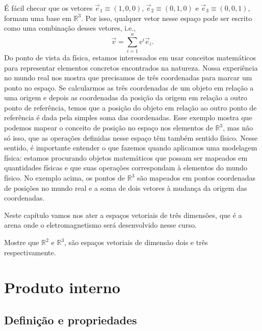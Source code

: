 É fácil checar que os vetores $\vec{e}_1 \equiv (1,0,0)$, $\vec{e}_2 \equiv
	(0,1,0)$ e $\vec{e}_3 \equiv (0,0,1)$, formam uma base em $\mathbb{R}^3$. Por
isso, qualquer vetor nesse espaço pode ser escrito como uma combinação desses
vetores, i.e.,
\begin{equation}
	\vec{v} = \sum_{i=1}^n v^i\vec{e}_i.
\end{equation}
Do ponto de vista da física, estamos interessados em usar conceitos matemáticos
para representar elementos concretos encontrados na natureza. Nossa experiência
no mundo real nos mostra que precisamos de três coordenadas para marcar um ponto
no espaço. Se calcularmos as três coordenadas de um objeto em relação a uma
origem e depois as coordenadas da posição da origem em relação a outro ponto de
referência, temos que a posição do objeto em relação ao outro ponto de
referência é dada pela simples soma das coordenadas.  Esse exemplo mostra que
podemos mapear o conceito de posição no espaço nos elementos de $\mathbb{R}^3$,
mas não só isso, que as operações definidas nesse espaço têm também sentido
físico. Nesse sentido, é importante entender o que fazemos quando aplicamos uma
modelagem física: estamos procurando objetos matemáticos que possam ser mapeados
em quantidades físicas e que suas operações correspondam à elementos do mundo
físico. No exemplo acima, os pontos de $\mathbb{R}^3$ são mapeados em pontos
coordenadas de posições no mundo real e a soma de dois vetores à mudança da
origem das coordenadas.

Neste capítulo vamos nos ater a espaços vetoriais de três dimensões, que é a
arena onde o eletromagnetismo será desenvolvido nesse curso.

\begin{Exercise}[label=dim, title={Espaço vetorial}]
	\vspace{-\baselineskip}%
	\Question Mostre que $\mathbb{R}^2$ e $\mathbb{R}^3$, são espaços
	vetoriais de dimensão dois e três respectivamente.
\end{Exercise}

\section{Produto interno}
\subsection{Definição e propriedades}

